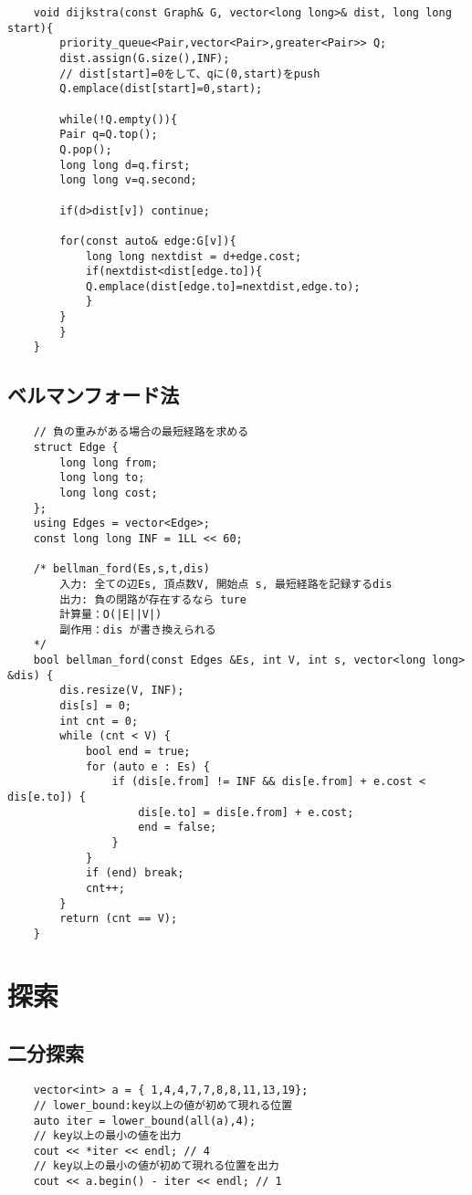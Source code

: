 \documentclass[a4paper, landscape, 9pt]{jarticle} %
\begin{document}
\begin{multicols*}{3}
\begin{lstlisting}
    void dijkstra(const Graph& G, vector<long long>& dist, long long start){
        priority_queue<Pair,vector<Pair>,greater<Pair>> Q;
        dist.assign(G.size(),INF);
        // dist[start]=0をして、qに(0,start)をpush
        Q.emplace(dist[start]=0,start); 
    
        while(!Q.empty()){
        Pair q=Q.top();
        Q.pop();
        long long d=q.first;
        long long v=q.second;
    
        if(d>dist[v]) continue;
    
        for(const auto& edge:G[v]){
            long long nextdist = d+edge.cost;
            if(nextdist<dist[edge.to]){
            Q.emplace(dist[edge.to]=nextdist,edge.to);
            }
        }
        }
    }
    \end{lstlisting}

    \subsection{ベルマンフォード法}
    \begin{lstlisting}
    // 負の重みがある場合の最短経路を求める
    struct Edge {
        long long from;
        long long to;
        long long cost;
    };
    using Edges = vector<Edge>;
    const long long INF = 1LL << 60;
    
    /* bellman_ford(Es,s,t,dis)
        入力: 全ての辺Es, 頂点数V, 開始点 s, 最短経路を記録するdis
        出力: 負の閉路が存在するなら ture
        計算量：O(|E||V|)
        副作用：dis が書き換えられる
    */
    bool bellman_ford(const Edges &Es, int V, int s, vector<long long> &dis) {
        dis.resize(V, INF);
        dis[s] = 0;
        int cnt = 0;
        while (cnt < V) {
            bool end = true;
            for (auto e : Es) {
                if (dis[e.from] != INF && dis[e.from] + e.cost < dis[e.to]) {
                    dis[e.to] = dis[e.from] + e.cost;
                    end = false;
                }
            }
            if (end) break;
            cnt++;
        }
        return (cnt == V);
    }    
    \end{lstlisting}

    \section{探索}
    \subsection{二分探索}
    \begin{lstlisting}
    vector<int> a = { 1,4,4,7,7,8,8,11,13,19};
    // lower_bound:key以上の値が初めて現れる位置
    auto iter = lower_bound(all(a),4);
    // key以上の最小の値を出力
    cout << *iter << endl; // 4
    // key以上の最小の値が初めて現れる位置を出力
    cout << a.begin() - iter << endl; // 1


\end{lstlisting}
\end{multicols*}
\end{document}

